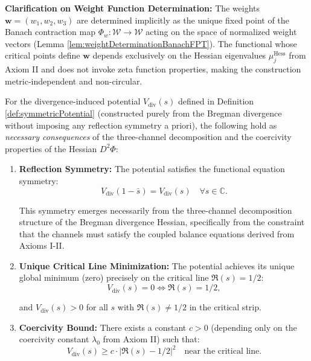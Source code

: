 \begin{theorem}
\begin{definition}
\textbf{Clarification on Weight Function Determination:} The weights $\mathbf{w} = (w_1, w_2, w_3)$ are determined implicitly as the unique fixed point of the Banach contraction map $\Phi_w: \mathcal{W} \to \mathcal{W}$ acting on the space of normalized weight vectors (Lemma \ref{lem:weightDeterminationBanachFPT}). The functional whose critical points define $\mathbf{w}$ depends exclusively on the Hessian eigenvalues $\mu_j^{\mathrm{Hess}}$ from Axiom II and does not invoke zeta function properties, making the construction metric-independent and non-circular.

\end{definition}

\begin{theorem}
\label{thm:reflectionSymmetryEmergent}

For the divergence-induced potential $V_{\mathrm{div}}(s)$ defined in Definition \ref{def:symmetricPotential} (constructed purely from the Bregman divergence without imposing any reflection symmetry a priori), the following hold as \emph{necessary consequences} of the three-channel decomposition and the coercivity properties of the Hessian $D^2\Phi$:

\begin{enumerate}

\item \textbf{Reflection Symmetry:} The potential satisfies the functional equation symmetry:
\begin{equation}
V_{\mathrm{div}}(1-\bar{s}) = V_{\mathrm{div}}(s) \quad \forall s \in \mathbb{C}.
\end{equation}

This symmetry emerges necessarily from the three-channel decomposition structure of the Bregman divergence Hessian, specifically from the constraint that the channels must satisfy the coupled balance equations derived from Axioms I-II.

\item \textbf{Unique Critical Line Minimization:} The potential achieves its unique global minimum (zero) precisely on the critical line $\Re(s) = 1/2$:
\begin{equation}
V_{\mathrm{div}}(s) = 0 \Leftrightarrow \Re(s) = 1/2,
\end{equation}

and $V_{\mathrm{div}}(s) > 0$ for all $s$ with $\Re(s) \neq 1/2$ in the critical strip.

\item \textbf{Coercivity Bound:} There exists a constant $c > 0$ (depending only on the coercivity constant $\lambda_0$ from Axiom II) such that:
\begin{equation}
V_{\mathrm{div}}(s) \geq c \cdot |\Re(s) - 1/2|^2 \quad \text{near the critical line.}
\end{equation}


\end{enumerate}
\end{theorem}
\end{theorem}
